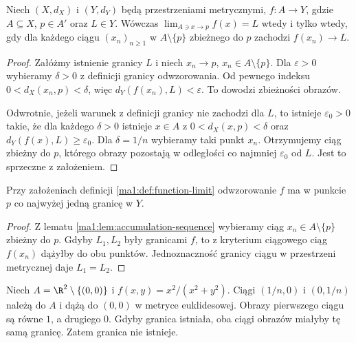 \begin{twierdzenie}
\label{ma1:thm:function-limit-sequential}
Niech $(X,d_X)$ i $(Y,d_Y)$ będą przestrzeniami metrycznymi, $f:A\to Y$, gdzie $A\subseteq X$, $p\in A'$ oraz $L\in Y$. Wówczas
$\lim_{A\ni x\to p}f(x)=L$ wtedy i tylko wtedy, gdy dla każdego ciągu $(x_n)_{n\ge1}$ w $A\setminus\{p\}$ zbieżnego do $p$ zachodzi $f(x_n)\to L$.
\end{twierdzenie}
\begin{proof}
Załóżmy istnienie granicy $L$ i niech $x_n\to p$, $x_n\in A\setminus\{p\}$. Dla $\varepsilon>0$ wybieramy $\delta>0$ z definicji granicy odwzorowania. Od pewnego indeksu $0<d_X(x_n,p)<\delta$, więc $d_Y(f(x_n),L)<\varepsilon$. To dowodzi zbieżności obrazów.

Odwrotnie, jeżeli warunek z definicji granicy nie zachodzi dla $L$, to istnieje $\varepsilon_0>0$ takie, że dla każdego $\delta>0$ istnieje $x\in A$ z $0<d_X(x,p)<\delta$ oraz $d_Y(f(x),L)\ge\varepsilon_0$. Dla $\delta=1/n$ wybieramy taki punkt $x_n$. Otrzymujemy ciąg zbieżny do $p$, którego obrazy pozostają w odległości co najmniej $\varepsilon_0$ od $L$. Jest to sprzeczne z założeniem.
\end{proof}
\begin{wniosek}
\label{ma1:cor:function-limit-unique}
Przy założeniach definicji \ref{ma1:def:function-limit} odwzorowanie $f$ ma w punkcie $p$ co najwyżej jedną granicę w $Y$.
\end{wniosek}
\begin{proof}
Z lematu \ref{ma1:lem:accumulation-sequence} wybieramy ciąg $x_n\in A\setminus\{p\}$ zbieżny do $p$. Gdyby $L_1,L_2$ były granicami $f$, to z kryterium ciągowego ciąg $f(x_n)$ dążyłby do obu punktów. Jednoznaczność granicy ciągu w przestrzeni metrycznej daje $L_1=L_2$.
\end{proof}
\begin{przyklad}
\label{ma1:ex:direction-dependent-limit}
Niech $A=\R^2\setminus\{(0,0)\}$ i $f(x,y)=x^2/(x^2+y^2)$. Ciągi $(1/n,0)$ i $(0,1/n)$ należą do $A$ i dążą do $(0,0)$ w metryce euklidesowej. Obrazy pierwszego ciągu są równe $1$, a drugiego $0$. Gdyby granica istniała, oba ciągi obrazów miałyby tę samą granicę. Zatem granica nie istnieje.
\end{przyklad}

